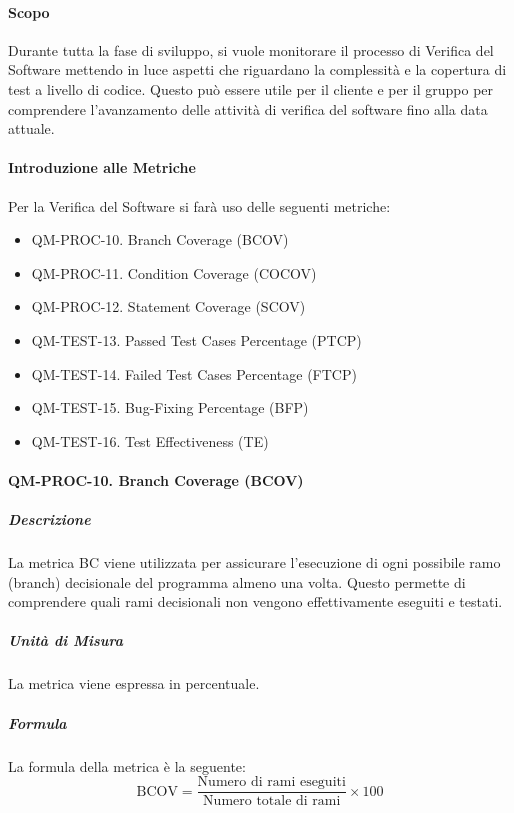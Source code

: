 		\paragraph{Scopo}

			Durante tutta la fase di sviluppo, si vuole monitorare il processo di Verifica del Software mettendo in luce aspetti che riguardano la complessità e la copertura di test a livello di codice. Questo può essere utile per il cliente e per il gruppo per comprendere l'avanzamento delle attività di verifica del software fino alla data attuale.

		\paragraph{Introduzione alle Metriche}

			Per la Verifica del Software si farà uso delle seguenti metriche:

			\begin{itemize}
				\item QM-PROC-10. Branch Coverage (BCOV)
				\item QM-PROC-11. Condition Coverage (COCOV)
				\item QM-PROC-12. Statement Coverage (SCOV)
				\item QM-TEST-13. Passed Test Cases Percentage (PTCP)
				\item QM-TEST-14. Failed Test Cases Percentage (FTCP)
				\item QM-TEST-15. Bug-Fixing Percentage (BFP)
				\item QM-TEST-16. Test Effectiveness (TE)
			\end{itemize}

		\paragraph{QM-PROC-10. Branch Coverage (BCOV)}

			\subparagraph{Descrizione}
			La metrica BC viene utilizzata per assicurare l'esecuzione di ogni possibile ramo (branch) decisionale del programma almeno una volta. Questo permette di comprendere quali rami decisionali non vengono effettivamente eseguiti e testati.

			\subparagraph{Unità di Misura}
			La metrica viene espressa in percentuale.

			\subparagraph{Formula}
			La formula della metrica è la seguente:
			\[
				\text{BCOV} = \frac{\text{Numero di rami eseguiti}}{\text{Numero totale di rami}} \times 100
			\]


